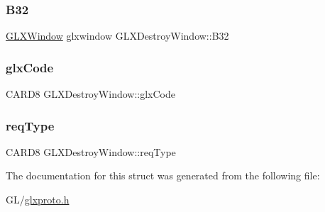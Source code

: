 \subsubsection{\texorpdfstring{B32}{B32}}
{\footnotesize\ttfamily \hyperlink{glx_8h_a7b7fbb726212feadef35c6c7c09b9541}{G\+L\+X\+Window} glxwindow G\+L\+X\+Destroy\+Window\+::\+B32}

\mbox{\label{struct_g_l_x_destroy_window_a0ed2d05a4efaded603dcb4b00000f9b8}} 
\subsubsection{\texorpdfstring{glx\+Code}{glxCode}}
{\footnotesize\ttfamily C\+A\+R\+D8 G\+L\+X\+Destroy\+Window\+::glx\+Code}

\mbox{\label{struct_g_l_x_destroy_window_ac945cf4300abf273b50823457831b71e}} 
\subsubsection{\texorpdfstring{req\+Type}{reqType}}
{\footnotesize\ttfamily C\+A\+R\+D8 G\+L\+X\+Destroy\+Window\+::req\+Type}



The documentation for this struct was generated from the following file\+:\begin{DoxyCompactItemize}
\item 
G\+L/\hyperlink{glxproto_8h}{glxproto.\+h}\end{DoxyCompactItemize}
